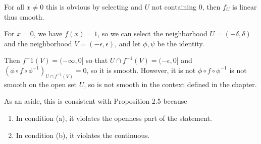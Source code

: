 For all $x \neq 0$ this is obvious by selecting and $U$ not containing $0$, then $f_U$ is linear thus smooth.

For $x=0$, we have $f(x) = 1$, so we can select the neighborhood $U = (-\delta, \delta)$ and the neighborhood $V = (-\epsilon, \epsilon)$, and let $\phi, \psi$ be the identity.

Then $f^-1(V) = (-\infty, 0]$ so that $U \cap f^{-1}(V) = (-\epsilon, 0]$ and $(\phi \circ f \circ \phi^{-1})_{U \cap f^{-1}(V)} = 0$, so it is smooth.  However, it is not $\phi \circ f \circ \phi^{-1}$ is not smooth on the open set $U$, so is not smooth in the context defined in the chapter.

As an aside, this is consistent with Proposition 2.5 because

\begin{enumerate}
\item In condition (a), it violates the openness part of the statement.
\item In condition (b), it violates the continuous.
\end{enumerate}